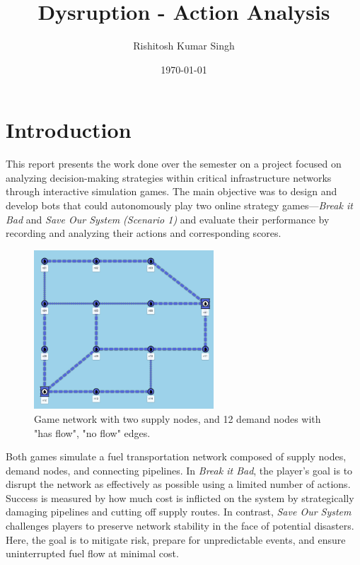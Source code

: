 \documentclass[12pt,a4paper]{article}
\title{Dysruption - Action Analysis}
\author{Rishitosh Kumar Singh}
\date{\today}
\begin{document}
\maketitle

\section{Introduction}
\label{sec:introduction}
    This report presents the work done over the semester on a project focused on analyzing decision-making strategies within critical infrastructure networks through interactive simulation games. The main objective was to design and develop bots that could autonomously play two online strategy games—\textit{Break it Bad} and \textit{Save Our System (Scenario 1)} and evaluate their performance by recording and analyzing their actions and corresponding scores.

    \begin{figure}[h!]
        \centering
        \includegraphics[width=0.6\textwidth]{images/game-graph.png}
        \caption{Game network with two supply nodes, and 12 demand nodes with "has flow", "no flow" edges.}
        \label{fig:game-graph}
    \end{figure}

    Both games simulate a fuel transportation network composed of supply nodes, demand nodes, and connecting pipelines. In \textit{Break it Bad}, the player's goal is to disrupt the network as effectively as possible using a limited number of actions. Success is measured by how much cost is inflicted on the system by strategically damaging pipelines and cutting off supply routes. In contrast, \textit{Save Our System} challenges players to preserve network stability in the face of potential disasters. Here, the goal is to mitigate risk, prepare for unpredictable events, and ensure uninterrupted fuel flow at minimal cost.
\end{document}
